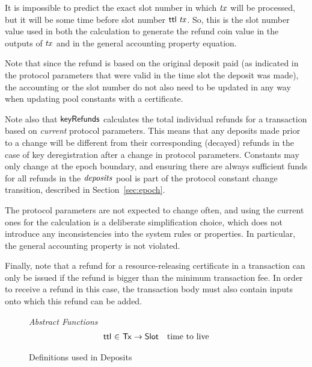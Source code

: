 \documentclass[11pt,a4paper,dvipsnames]{article}
\newcommand{\Tx}{\type{Tx}}
\newcommand{\Slot}{\type{Slot}}
\theoremstyle{definition}
\theoremstyle{definition}
\begin{document}
It is impossible to predict the exact slot
number in which $\mathit{tx}$ will be processed, but it will be some time before
slot number $\mathsf{ttl}~\mathit{tx}$. So, this is the slot number value used in both
the calculation to generate the refund coin value in the outputs of $\mathit{tx}$
and in the general accounting property equation.

Note that since the refund is based
on the original deposit paid (as indicated in the protocol parameters that
were valid in the time slot the deposit was made), the accounting or the slot
number do not also need to be updated in any way when updating pool constants with
a certificate.

Note also that
$\mathsf{keyRefunds}$ calculates the total individual refunds for a transaction
based on \textit{current} protocol parameters. This means that any deposits
made prior to a change will be different from their corresponding
(decayed) refunds in the case of key deregistration after a change in
protocol parameters. Constants may only change at the epoch boundary, and
ensuring there are always sufficient funds for all
refunds in the $\mathit{deposits}$ pool is part of the protocol constant
change transition, described in Section~\ref{sec:epoch}.

The protocol parameters are not
expected to change often, and using the current ones for the calculation
is a deliberate simplification choice, which does not introduce any inconsistencies
into the system rules or properties. In particular, the general accounting
property is not violated.

Finally, note that a refund for a resource-releasing certificate in a
transaction can only be issued if the refund is bigger than the minimum
transaction fee. In order to receive a refund in this case, the transaction
body must also contain inputs onto which this refund can be added.


\begin{figure*}
  \emph{Abstract Functions}
  \begin{equation*}
    \begin{array}{r@{~\in~}lr}
      \fun{ttl} & \Tx \to \Slot
        & \text{time to live}\\
    \end{array}
  \end{equation*}
  \caption{Definitions used in Deposits}
  \label{fig:defs:deposits}
\end{figure*}
\end{document}
